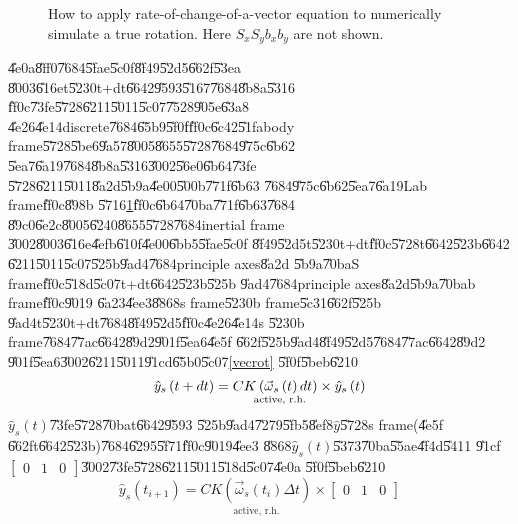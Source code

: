 \documentclass[12pt,a4paper]{article}
\begin{document}
\begin{figure}[th]
\caption{How to apply rate-of-change-of-a-vector equation to numerically
simulate a true rotation. Here $S_{x}S_{y}b_{x}b_{y}$ are not shown.}
\label{szsbtdtfig}
\begin{center}
\fbox{}
\end{center}
\end{figure}

\bigskip

\U{4e0a}\U{8ff0}\U{7684}\U{5fae}\U{5c0f}\U{8f49}\U{52d5}\U{662f}\U{53ea}%
\U{8003}\U{616e}t\U{5230}t+dt\U{6642}\U{9593}\U{5167}\U{7684}\U{8b8a}\U{5316}%
\U{ff0c}\U{73fe}\U{5728}\U{6211}\U{5011}\U{5c07}\U{7528}\U{905e}\U{63a8}%
\U{4e26}\U{4e14}discrete\U{7684}\U{65b9}\U{5f0f}\U{ff0c}\U{6c42}\U{51fa}body
frame\U{5728}\U{5be6}\U{9a57}\U{8005}\U{8655}\U{5728}\U{7684}\U{975c}\U{6b62}%
\U{5ea7}\U{6a19}\U{7684}\U{8b8a}\U{5316}\U{3002}\U{56e0}\U{6b64}\U{73fe}%
\U{5728}\U{6211}\U{5011}\U{8a2d}\U{5b9a}\U{4e00}\U{500b}\U{771f}\U{6b63}%
\U{7684}\U{975c}\U{6b62}\U{5ea7}\U{6a19}Lab frame\thinspace \U{ff0c}\U{898b}%
\U{5716}\ref{szsbtdtfig}\U{ff0c}\U{6b64}\U{70ba}\U{771f}\U{6b63}\U{7684}%
\U{89c0}\U{6e2c}\U{8005}\U{6240}\U{8655}\U{5728}\U{7684}inertial frame%
\U{3002}\U{8003}\U{616e}\U{4efb}\U{610f}\U{4e00}\U{6bb5}\U{5fae}\U{5c0f}%
\U{8f49}\U{52d5}t\U{5230}t+dt\U{ff0c}\U{5728}t\U{6642}\U{523b}\U{6642}%
\U{6211}\U{5011}\U{5c07}\U{525b}\U{9ad4}\U{7684}principle axes\U{8a2d}%
\U{5b9a}\U{70ba}S frame\U{ff0c}\U{518d}\U{5c07}t+dt\U{6642}\U{523b}\U{525b}%
\U{9ad4}\U{7684}principle axes\U{8a2d}\U{5b9a}\U{70ba}b frame\U{ff0c}\U{9019}%
\U{6a23}\U{4ee3}\U{8868}s frame\U{5230}b frame\U{5c31}\U{662f}\U{525b}%
\U{9ad4}t\U{5230}t+dt\U{7684}\U{8f49}\U{52d5}\U{ff0c}\U{4e26}\U{4e14}s%
\U{5230}b frame\U{7684}\U{77ac}\U{6642}\U{89d2}\U{901f}\U{5ea6}\U{4e5f}%
\U{662f}\U{525b}\U{9ad4}\U{8f49}\U{52d5}\U{7684}\U{77ac}\U{6642}\U{89d2}%
\U{901f}\U{5ea6}\U{3002}\U{6211}\U{5011}\U{91cd}\U{65b0}\U{5c07}\ref{vecrot}%
\U{5f0f}\U{5beb}\U{6210}%
\begin{equation}
\hat{y}_{s}\left( t+dt\right) =\underset{\text{active, r.h.}}{CK\left( \vec{%
\omega}_{s}\left( t\right) dt\right) }\times \hat{y}_{s}\left( t\right)
\label{vecrot05}
\end{equation}%
$\hat{y}_{s}\left( t\right) $\U{73fe}\U{5728}\U{70ba}t\U{6642}\U{9593}%
\U{525b}\U{9ad4}\U{7279}\U{5fb5}\U{8ef8}$\hat{y}$\U{5728}s frame(\U{4e5f}%
\U{662f}t\U{6642}\U{523b})\U{7684}\U{6295}\U{5f71}\U{ff0c}\U{9019}\U{4ee3}%
\U{8868}$\hat{y}_{s}\left( t\right) $\U{5373}\U{70ba}\U{55ae}\U{4f4d}\U{5411}%
\U{91cf}$\left[ 
\begin{array}{ccc}
0 & 1 & 0%
\end{array}%
\right] $\U{3002}\U{73fe}\U{5728}\U{6211}\U{5011}\U{518d}\U{5c07}\U{4e0a}%
\U{5f0f}\U{5beb}\U{6210}%
\begin{equation}
\hat{y}_{s}\left( t_{i+1}\right) =\underset{\text{active, r.h.}}{CK\left( 
\vec{\omega}_{s}\left( t_{i}\right) \Delta t\right) }\times \left[ 
\begin{array}{ccc}
0 & 1 & 0%
\end{array}%
\right]  \label{vecrot1}
\end{equation}
\end{document}
